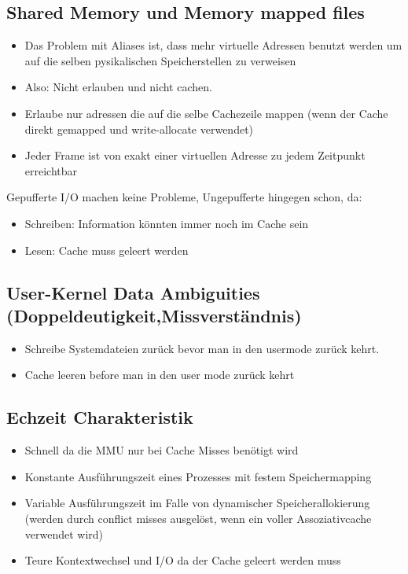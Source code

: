 \documentclass[a4paper]{scrreprt}
\begin{document}
\subsection{Shared Memory und Memory mapped files}
\begin{itemize}
\item Das Problem mit  Aliases ist, dass mehr virtuelle Adressen benutzt werden um auf die selben pysikalischen Speicherstellen zu verweisen
\item Also: Nicht erlauben und nicht cachen.
\item Erlaube nur adressen die auf die selbe Cachezeile mappen (wenn der Cache direkt gemapped und write-allocate verwendet)
\item Jeder Frame ist von exakt einer virtuellen Adresse zu jedem Zeitpunkt erreichtbar
\end{itemize}

 Gepufferte I/O machen keine Probleme, Ungepufferte hingegen schon, da:
 \begin{itemize}
 
\item Schreiben: Information könnten immer noch im Cache sein
\item Lesen: Cache muss geleert werden
 \end{itemize}

\subsection{User-Kernel Data Ambiguities (Doppeldeutigkeit,Missverständnis)}
\begin{itemize}
\item Schreibe Systemdateien zurück bevor man in den usermode zurück kehrt.
\item Cache leeren before man in den user mode zurück kehrt
\end{itemize}

\subsection{Echzeit Charakteristik}

\begin{itemize}
\item Schnell da die MMU nur bei Cache Misses benötigt wird
\item Konstante  Ausführungszeit eines Prozesses mit festem Speichermapping
\item Variable Ausführungszeit im Falle von dynamischer Speicherallokierung (werden durch conflict misses ausgelöst, wenn ein voller Assoziativcache verwendet wird)
\item Teure Kontextwechsel und I/O da der Cache geleert werden muss
\end{itemize}
\end{document}
